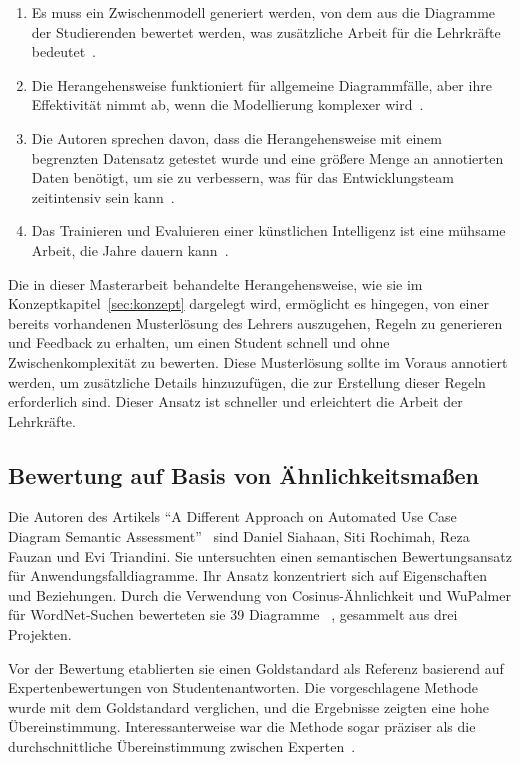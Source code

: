 \begin{enumerate}
    \item Es muss ein Zwischenmodell generiert werden, von dem aus die Diagramme der Studierenden bewertet werden,
    was zusätzliche Arbeit für die Lehrkräfte bedeutet~\cite{boubekeur2020automatic}.
    \item Die Herangehensweise funktioniert für allgemeine Diagrammfälle, aber ihre Effektivität nimmt ab, wenn die
    Modellierung komplexer wird~\cite{boubekeur2020automatic}.
    \item Die Autoren sprechen davon, dass die Herangehensweise mit einem begrenzten Datensatz getestet wurde und
    eine größere Menge an annotierten Daten benötigt, um sie zu verbessern, was für das
    Entwicklungsteam zeitintensiv sein kann~\cite{boubekeur2020automatic}.
    \item Das Trainieren und Evaluieren einer künstlichen Intelligenz ist eine mühsame Arbeit, die Jahre dauern kann~\cite{boubekeur2020automatic}.
\end{enumerate}

Die in dieser Masterarbeit behandelte Herangehensweise, wie sie im Konzeptkapitel~\ref{sec:konzept} dargelegt wird,
ermöglicht es hingegen, von einer bereits vorhandenen Musterlösung des Lehrers auszugehen, Regeln zu generieren und
Feedback zu erhalten, um einen Student schnell und ohne Zwischenkomplexität zu bewerten. Diese Musterlösung sollte im
Voraus annotiert werden, um zusätzliche Details hinzuzufügen, die zur Erstellung dieser Regeln erforderlich sind. Dieser
Ansatz ist schneller und erleichtert die Arbeit der Lehrkräfte.


\subsection{Bewertung auf Basis von Ähnlichkeitsmaßen}

Die Autoren des Artikels ``A Different Approach on Automated Use Case Diagram Semantic
Assessment''~\cite{fauzan2021different} sind Daniel Siahaan, Siti Rochimah, Reza Fauzan und Evi Triandini. Sie
untersuchten  einen semantischen Bewertungsansatz für Anwendungsfalldiagramme. Ihr Ansatz konzentriert sich auf
Eigenschaften und Beziehungen. Durch die Verwendung von Cosinus-Ähnlichkeit und WuPalmer für WordNet-Suchen bewerteten
sie 39 Diagramme ~\cite{fauzan2021different,al2017matching}, gesammelt aus drei Projekten.

Vor der Bewertung etablierten sie einen Goldstandard als Referenz basierend auf Expertenbewertungen von Studentenantworten. Die
vorgeschlagene Methode wurde mit dem Goldstandard verglichen, und die Ergebnisse zeigten eine hohe
Übereinstimmung. Interessanterweise war die Methode sogar präziser als die durchschnittliche Übereinstimmung zwischen
Experten~\cite{fauzan2021different}.

